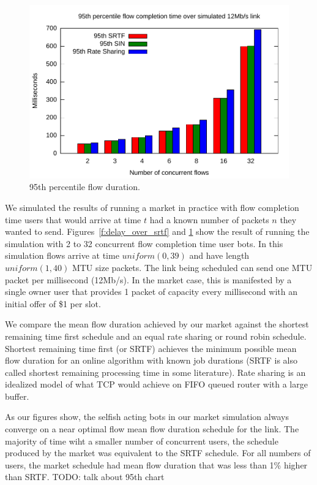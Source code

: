 \begin{figure}
\includegraphics[width=\columnwidth]{plots/95th_delay_over_srtf.pdf}
\caption{95th percentile flow duration.}
\label{f:95th_delay_over_srtf}
\end{figure}

We simulated the results of running a market in practice with flow completion time users that would arrive at time $t$ had a known number of packets $n$ they wanted to send.
Figures~\ref{f:delay_over_srtf} and \ref{f:95th_delay_over_srtf} show the result of running the simulation with 2 to 32 concurrent flow completion time user bots. In this simulation flows arrive at time $uniform(0, 39)$ and have length $uniform(1, 40)$ MTU size packets.
The link being scheduled can send one MTU packet per millisecond (12Mb/s). In the market case, this is manifested by a single owner user that provides 1 packet of capacity every millisecond with an initial offer of \$1 per slot.

We compare the mean flow duration achieved by our market against the shortest remaining time first schedule and an equal rate sharing or round robin schedule. Shortest remaining time first (or SRTF) achieves the minimum possible mean flow duration for an online algorithm with known job durations\cite{karger10,bansal01} (SRTF is also called shortest remaining processing time in some literature).
Rate sharing is an idealized model of what TCP would achieve on FIFO queued router with a large buffer.

As our figures show, the selfish acting bots in our market simulation always converge on a near optimal flow mean flow duration schedule for the link. The majority of time wiht a smaller number of concurrent users, the schedule produced by the market was equivalent to the SRTF schedule. For all numbers of users, the market schedule had mean flow duration that was less than 1\% higher than SRTF.
TODO: talk about 95th chart

